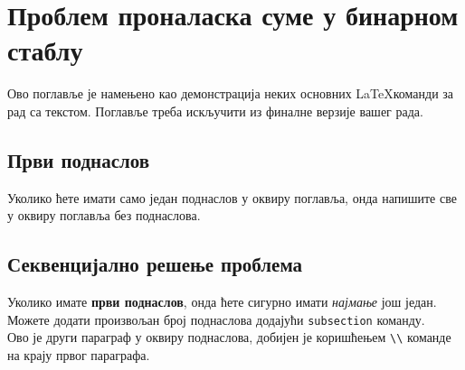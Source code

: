 
\section{Проблем проналаска суме у бинарном стаблу}
Ово поглавље је намењено као демонстрација неких основних \LaTeX команди за рад са текстом. Поглавље треба искључити из финалне верзије вашег рада.

\subsection{Први поднаслов}
Уколико ћете имати само један поднаслов у оквиру поглавља, онда напишите све у оквиру поглавља без поднаслова.

\subsection{Секвенцијално решење проблема}
Уколико имате \textbf{први поднаслов}, онда ћете сигурно имати \textit{најмање} још један. Можете додати произвољан број поднаслова додајући \texttt{subsection} команду.\\

Ово је други параграф у оквиру поднаслова, добијен је коришћењем \texttt{\textbackslash\textbackslash} команде на крају првог параграфа.

